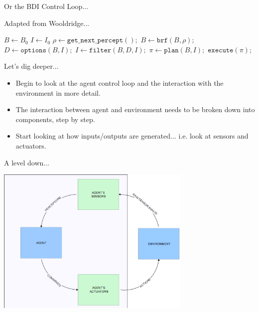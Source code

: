 \documentclass[aspectratio=1610,xcolor=dvipsnames,t]{beamer}
\begin{document}
\begin{frame}{Or the BDI Control Loop...}
    \begin{block}{Adapted from Wooldridge...} 
        \begin{algorithmic}[0] 
                \State $B \gets B_0$
                \State $I \gets I_0$
                    \State $\rho \gets \texttt{get\_next\_percept}();$
                    \State $B \gets \texttt{brf}(B, \rho);$
                    \State $D \gets \texttt{options}(B, I);$ 
                    \State $I \gets \texttt{filter}(B, D, I); $
                    \State $\pi \gets \texttt{plan}(B, I); $
                    \State $\texttt{execute}(\pi); $
                \EndWhile
            \EndProcedure
        \end{algorithmic} 
    \end{block} 
\end{frame} 

\begin{frame}{Let's dig deeper...}
    \begin{itemize}
        \item Begin to look at the agent control loop and the interaction
              with the environment in more detail.
        \item The interaction between agent and environment needs to be
              broken down into components, step by step.
        \item Start looking at how inputs/outputs are generated...
              i.e. look at sensors and actuators.
    \end{itemize} 
\end{frame} 

\begin{frame}{A level down...}
    \begin{center}
        \includegraphics[width=0.7\textwidth]{sensorsactuators} 
    \end{center} 
\end{frame} 
\end{document}

